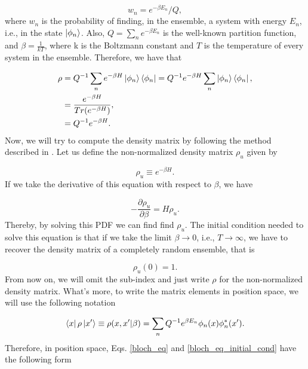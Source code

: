 \documentclass{article}
\begin{document}
\begin{equation}
    w_{n} = e^{-\beta E_{n}} / Q,
\end{equation}
%
where $w_{n}$ is the probability of finding, in the ensemble, a system with energy $E_{n}$, i.e., in the state $\ket{\phi_n}$.
Also, $Q = \sum_{n} e^{-\beta E_{n}}$ is the well-known partition function, and $\beta = \frac{1}{k T}$, where k is the Boltzmann constant and $T$ is the temperature of every system in the ensemble. Therefore, we have that

\begin{equation}
    \begin{split}
        \rho & = Q^{-1} \sum_{n} e^{-\beta H} \ket{\phi_n} \bra{\phi_n} = Q^{-1} e^{-\beta H} \sum_{n} \ket{\phi_n} \bra{\phi_n}, \\ & = \frac{e^{-\beta H}}{Tr(e^{-\beta H})}, \\ & = Q^{-1} e^{-\beta H}.
    \end{split}
\end{equation}
%
Now, we will try to compute the density matrix by following the method described in \cite{Feynman1972-tl}. Let us define the non-normalized density matrix $\rho_u$ given by

\begin{equation}
    \rho_u \equiv e^{-\beta H}.
\end{equation}
%
If we take the derivative of this equation with respect to $\beta$, we have

\begin{equation}\label{bloch_eq}
    - \frac{\partial \rho_u}{\partial \beta} = H \rho_u.
\end{equation}
%
Thereby, by solving this PDF we can find find $\rho_u$. The initial condition needed to solve this equation is that if we take the limit $\beta \longrightarrow 0$, i.e., $T \longrightarrow \infty$, we have to recover the density matrix of a completely random ensemble, that is

\begin{equation}\label{bloch_eq_initial_cond}
    \rho_u(0) = 1.
\end{equation}
%
From now on, we will omit the sub-index and just write $\rho$ for the non-normalized density matrix. What's more, to write the matrix elements in position space, we will use the following notation

\begin{equation}
    \bra{x} \rho \ket{x'} \equiv \rho(x, x' | \beta) = \sum_{n} Q^{-1} e^{\beta E_{n}} \phi_n (x) \phi_{n}^{*} (x').
\end{equation}
%
Therefore, in position space, Eqs. \ref{bloch_eq} and \ref{bloch_eq_initial_cond} have the following form
\end{document}
